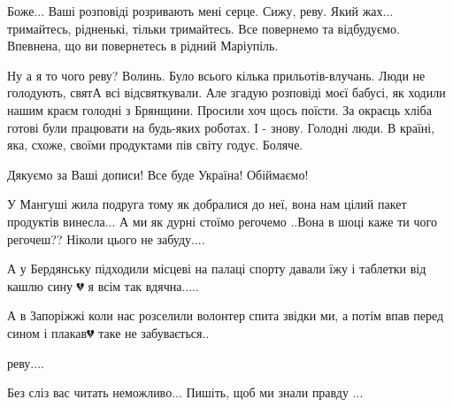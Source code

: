 
Боже... Ваші розповіді розривають мені серце. Сижу, реву. Який жах...
тримайтесь, рідненькі, тільки тримайтесь. Все повернемо та відбудуємо.
Впевнена, що ви повернетесь в рідний Маріупіль.


Ну а я то чого реву? Волинь. Було всього кілька прильотів-влучань. Люди не
голодують, святА всі відсвяткували. Але згадую розповіді моєї бабусі, як ходили
нашим краєм голодні з Брянщини. Просили хоч щось поїсти. За окраєць хліба
готові були працювати на будь-яких роботах. І - знову. Голодні люди. В країні,
яка, схоже, своїми продуктами пів світу годує. Боляче.


Дякуємо за Ваші дописи! Все буде Україна! Обіймаємо!


У Мангуші жила подруга тому як добралися до неї, вона нам цілий пакет продуктів
винесла... А ми як дурні стоїмо регочемо ..Вона в шоці каже ти чого регочеш??
Ніколи цього не забуду....

А у Бердянську підходили місцеві на палаці спорту давали їжу і таблетки від кашлю сину 💔 я всім так вдячна.....

А в Запоріжжі коли нас розселили волонтер спита звідки ми, а потім впав перед
сином і плакав💔 таке не забувається..


реву....


Без сліз вас читать неможливо... Пишіть, щоб ми знали правду ...
